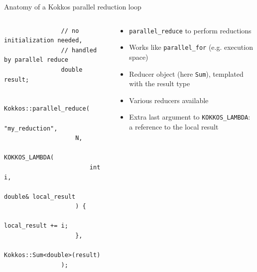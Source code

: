 \documentclass[aspectratio=169]{beamer}
\begin{document}
\begin{frame}[fragile]{Anatomy of a Kokkos parallel reduction loop}
    \begin{columns}
        \begin{column}{0.5\linewidth}
            \begin{verbatim}
                // no initialization needed,
                // handled by parallel reduce
                double result;

                Kokkos::parallel_reduce(
                    "my_reduction",
                    N,
                    KOKKOS_LAMBDA(
                        int i,
                        double& local_result
                    ) {
                        local_result += i;
                    },
                    Kokkos::Sum<double>(result)
                );
            \end{verbatim}
        \end{column}
        \begin{column}{0.5\linewidth}
            \begin{itemize}
                \item \texttt{parallel\_reduce} to perform reductions
                \item Works like \texttt{parallel\_for} (e.g. execution space)
                \item Reducer object (here \texttt{Sum}), templated with the result type
                \item Various reducers available
                \item Extra last argument to \texttt{KOKKOS\_LAMBDA}: a reference to the local result
            \end{itemize}
        \end{column}
    \end{columns}
\end{frame}

\end{document}
